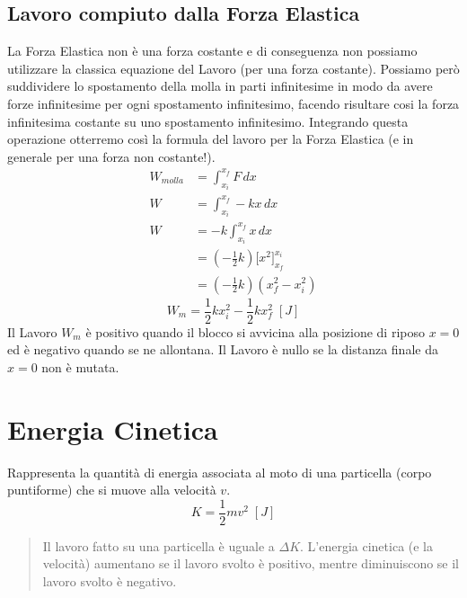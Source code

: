         \subsection{Lavoro compiuto dalla Forza Elastica} La Forza Elastica non 
        è una forza costante e di conseguenza non possiamo utilizzare la 
        classica equazione del Lavoro (per una forza costante). Possiamo però 
        suddividere lo spostamento della molla in parti infinitesime in modo da
        avere forze infinitesime per ogni spostamento infinitesimo, facendo 
        risultare cosi la forza infinitesima costante su uno spostamento 
        infinitesimo. Integrando questa operazione otterremo così la formula 
        del lavoro per la Forza Elastica 
        (e in generale per una forza non costante!).
        \begin{align*}
            W_{molla} &= \int_{x_i}^{x_f} F \,dx \\
            W &= \int_{x_i}^{x_f} -kx \,dx \\
            W &= -k \int_{x_i}^{x_f} x \,dx \\
            &= (-\frac{1}{2}k)\bigg[x^2 \bigg]_{x_f}^{x_i} \\
            &= (-\frac{1}{2}k) (x^2_f - x^2_i)
        \end{align*}
        \begin{equation}
            W_m = \frac{1}{2}kx^2_i - \frac{1}{2}kx^2_f \;[J]
        \end{equation}
        Il Lavoro $W_m$ è positivo quando il blocco si avvicina alla posizione 
        di riposo $x=0$ ed è negativo quando se ne allontana. Il Lavoro è nullo
        se la distanza finale da $x=0$ non è mutata.

    \section{Energia Cinetica} Rappresenta la quantità di energia associata al 
        moto di una particella (corpo puntiforme) che si muove alla velocità 
        $v$.
        \begin{equation}
            K = \frac{1}{2}mv^2 \;[J]
        \end{equation}

        \begin{quote}
            Il lavoro fatto su una particella è uguale a $\Delta K$. L'energia 
            cinetica (e la velocità) aumentano se il lavoro svolto è positivo, 
            mentre diminuiscono se il lavoro svolto è negativo.
        \end{quote}

